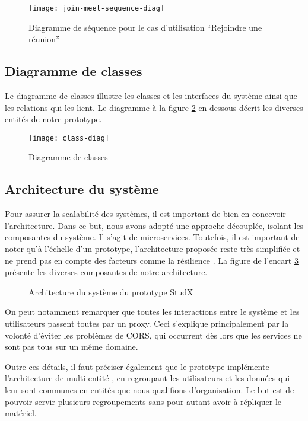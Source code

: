 \begin{figure}[H]
  \centering
  \texttt{[image: join-meet-sequence-diag]}
  \caption{Diagramme de séquence pour le cas d’utilisation “Rejoindre une réunion”}
  \label{fig:join_meet_seq_diag}
\end{figure}

\subsection{Diagramme de classes}
Le diagramme de classes illustre les classes et les interfaces du système ainsi que les relations qui les lient. 
Le diagramme à la figure \ref{fig:class_diag} en dessous décrit les diverses entités de notre prototype.

\begin{figure}[H]
  \centering
  \texttt{[image: class-diag]}
  \caption{Diagramme de classes}
  \label{fig:class_diag}
\end{figure}

\subsection{Architecture du système}
Pour assurer la scalabilité des systèmes, il est important de bien en concevoir l’architecture. 
Dans ce but, nous avons adopté une approche découplée, isolant les composantes du système. 
Il s’agit de microservices. Toutefois, il est important de noter qu'à l'échelle d’un prototype, 
l’architecture proposée reste très simplifiée et ne prend pas en compte des facteurs comme la résilience \cite{microservices_resiliency}. 
La figure de l'encart \ref{fig:system_design} présente les diverses composantes de notre architecture.


\begin{figure}[H]
  \centering
  \caption{Architecture du système du prototype StudX}
  \label{fig:system_design}
\end{figure}

On peut notamment remarquer que toutes les interactions entre le système et les utilisateurs passent toutes par un proxy. 
Ceci s’explique principalement par la volonté d'éviter les problèmes de CORS, 
qui occurrent dès lors que les services ne sont pas tous sur un même domaine.

Outre ces détails, il faut préciser également que le prototype implémente l’architecture de multi-entité \cite{multitenancy}, 
en regroupant les utilisateurs et les données qui leur sont communes en entités que nous qualifions d’organisation. 
Le but est de pouvoir servir plusieurs regroupements sans pour autant avoir à répliquer le matériel. 

